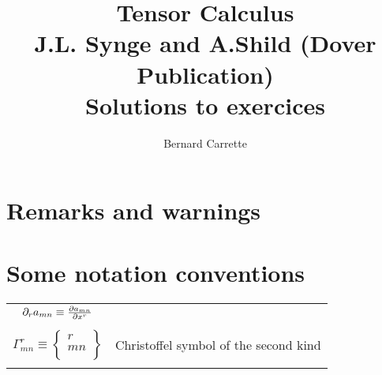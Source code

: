\documentclass{ut-thesis}
\author{Bernard Carrette}
\title{Tensor Calculus\\J.L. Synge and A.Shild (Dover Publication)\\ Solutions to exercices}
\begin{document}
\maketitle

\section*{Remarks and warnings}
\section*{Some notation conventions}
\begin{center}
\begin{tabular}{ c c  }
$\partial_ra_{mn}\equiv \pdv{a_{m n}}{x^r}$ & \\\\
$\Gamma^r_{mn} \equiv 
\begin{Bmatrix}
r\\
m n\\
\end{Bmatrix}$ & Christoffel symbol of the second kind\\\\

\end{tabular}
\end{center}

\tableofcontents


%
%
%
%
\end{document}

